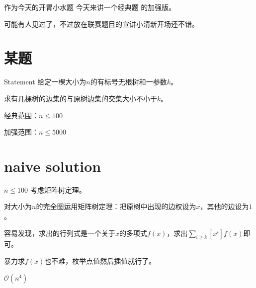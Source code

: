 \begin{frame}{作为今天的开胃小水题}
	今天来讲一个经典题\pause
	的加强版。

	\pause
	可能有人见过了，不过放在联赛题目的宣讲小清新开场还不错。
\end{frame}
\section{某题}
\begin{frame}{Statement}
	给定一棵大小为$n$的有标号无根树和一参数$k$。
	
	求有几棵树的边集的与原树边集的交集大小不小于$k$。

	经典范围：$n\le 100$

	加强范围：$n\le 5000$
\end{frame}
\section{naive solution}
\begin{frame}{$n\le 100$}
	考虑矩阵树定理。

	对大小为$n$的完全图运用矩阵树定理：把原树中出现的边权设为$x$，其他的边设为$1$。\pause

	容易发现，求出的行列式是一个关于$x$的多项式$f(x)$，求出$\sum_{i\geq k}[x^i]f(x)$即可。

	暴力求$f(x)$也不难，枚举点值然后插值就行了。\pause

	$\mathcal O(n^4)$
\end{frame}
